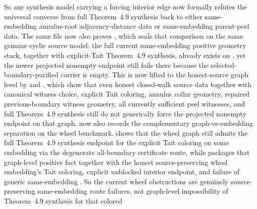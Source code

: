 \documentclass[11pt]{article}
\begin{document}
\begin{itemize}
So any synthesis model carrying a forcing interior edge now formally refutes
the universal converse from full Theorem~4.9 synthesis back to either
same-embedding annulus-root adjacency-distance data or same-embedding
parent-peel data.  The same file now also proves
,
which seals that comparison on the same genuine cyclic source model: the full
current same-embedding positive geometry stack, together with explicit-Tait
Theorem~4.9 synthesis, already exists on
, yet the newer projected nonempty
endpoint still fails there because the selected-boundary-purified carrier is
empty.  This is now lifted to the honest-source graph level by
and
,
which show that even honest closed-walk source data together with canonical
witness choice, explicit Tait coloring, annulus collar geometry, repaired
previous-boundary witness geometry, all currently sufficient peel witnesses,
and full Theorem~4.9 synthesis still do not generically force the projected
nonempty endpoint on that graph.  
now also records the complementary graph-vs-embedding separation on the wheel
benchmark.  
shows that the wheel graph still admits the full Theorem~4.9 synthesis
endpoint for the explicit Tait coloring on some embedding via the degenerate
all-boundary certificate route, while
packages that graph-level positive fact together with the honest
source-preserving wheel embedding's Tait coloring, explicit unblocked
interior endpoint, and failure of generic same-embedding
.  So the current wheel
obstructions are genuinely source-preserving same-embedding route failures,
not graph-level impossibility of Theorem~4.9 synthesis for that colored

\end{itemize}
\end{document}
